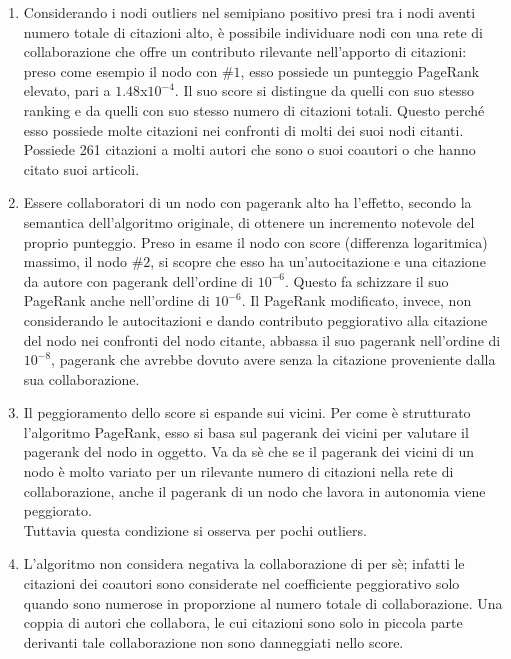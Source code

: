 \documentclass[a4paper, 12pt]{article}
\begin{document}
\begin{enumerate}
  \item Considerando i nodi outliers nel semipiano positivo presi tra i nodi aventi numero totale di citazioni alto, è possibile individuare nodi con una rete di collaborazione che offre un contributo rilevante nell'apporto di citazioni: \\
  preso come esempio il nodo con $\#1$, esso possiede un punteggio PageRank elevato, pari a $1.48$x$10^{-4}$. Il suo score si distingue da quelli con suo stesso ranking e da quelli con suo stesso numero di citazioni totali. Questo perché esso possiede molte citazioni nei confronti di molti dei suoi nodi citanti. Possiede 261 citazioni a molti autori che sono o suoi coautori o che hanno citato suoi articoli.
  \item Essere collaboratori di un nodo con pagerank alto ha l'effetto, secondo la semantica dell'algoritmo originale, di ottenere un incremento notevole del proprio punteggio.
  Preso in esame il nodo con score (differenza logaritmica) massimo, il nodo $\#2$, si scopre che esso ha un'autocitazione e una citazione da autore con pagerank dell'ordine di $10^{-6}$. Questo fa schizzare il suo PageRank anche nell'ordine di $10^{-6}$. Il PageRank modificato, invece, non considerando le autocitazioni e dando contributo peggiorativo alla citazione del nodo nei confronti del nodo citante, abbassa il suo pagerank nell'ordine di $10^{-8}$, pagerank che avrebbe dovuto avere senza la citazione proveniente dalla sua collaborazione.
  \item Il peggioramento dello score si espande sui vicini. Per come è strutturato l'algoritmo PageRank, esso si basa sul pagerank dei vicini per valutare il pagerank del nodo in oggetto. Va da sè che se il pagerank dei vicini di un nodo è molto variato per un rilevante numero di citazioni nella rete di collaborazione, anche il pagerank di un nodo che lavora in autonomia viene peggiorato. \\
  Tuttavia questa condizione si osserva per pochi outliers.
  \item L'algoritmo non considera negativa la collaborazione di per sè; infatti le citazioni dei coautori sono considerate nel coefficiente peggiorativo solo quando sono numerose in proporzione al numero totale di collaborazione. Una coppia di autori che collabora, le cui citazioni sono solo in piccola parte derivanti tale collaborazione non sono danneggiati nello score.
\end{enumerate}
\end{document}
